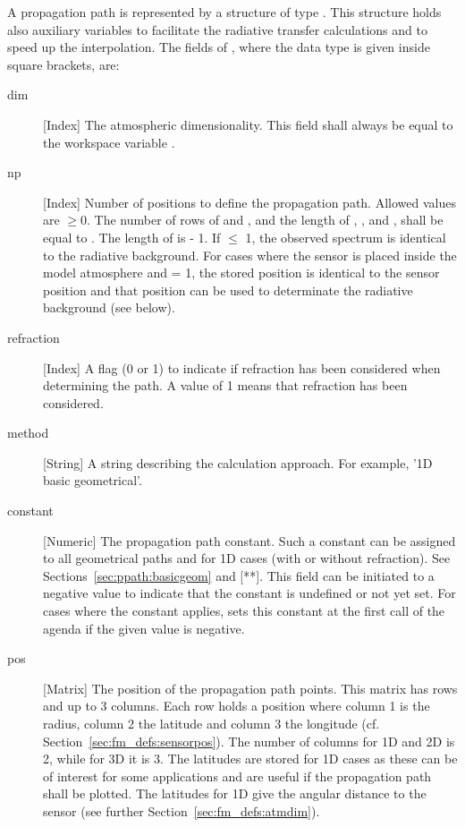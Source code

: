 A propagation path is represented by a structure of type
. This structure holds also auxiliary variables to
facilitate the radiative transfer calculations and to speed up the
interpolation. The fields of , where
the data type is given inside square brackets, are:
\begin{description}

  \item[dim] [Index] The atmospheric dimensionality. This field shall always 
     be equal to the workspace variable .
     
   \item[np] [Index] Number of positions to define the propagation
     path. Allowed values are $\geq 0$. The number of rows of
      and , and the length of
     , ,  and
     , shall be equal to . The length
     of  is  - 1. If 
     $\leq$ 1, the observed spectrum is identical to the radiative
     background. For cases where the sensor is placed inside the model
     atmosphere and  = 1, the stored position is
     identical to the sensor position and that position can be used to
     determinate the radiative background (see below).

   \item[refraction] [Index] A flag (0 or 1) to indicate if refraction
     has been considered when determining the path. A value of 1 means
     that refraction has been considered.

   \item[method] [String] A string describing the calculation approach.
     For example, '1D basic geometrical'.
     
   \item[constant] [Numeric] The propagation path constant. Such a
     constant can be assigned to all geometrical paths and for 1D
     cases (with or without refraction). See
     Sections~\ref{sec:ppath:basicgeom} and [**]. This field can be
     initiated to a negative value to indicate that the constant is
     undefined or not yet set. For cases where the constant applies,
      sets this constant at the first
     call of the agenda if the given value is negative.

   \item[pos] [Matrix] The position of the propagation path points.
     This matrix has  rows and up to 3 columns. Each row
     holds a position where column 1 is the radius, column 2 the
     latitude and column 3 the longitude (cf.
     Section~\ref{sec:fm_defs:sensorpos}). The number of columns for
     1D and 2D is 2, while for 3D it is 3. The latitudes are stored
     for 1D cases as these can be of interest for some applications
     and are useful if the propagation path shall be plotted. The
     latitudes for 1D give the angular distance to the sensor (see
     further Section~\ref{sec:fm_defs:atmdim}).
     

\end{description}
